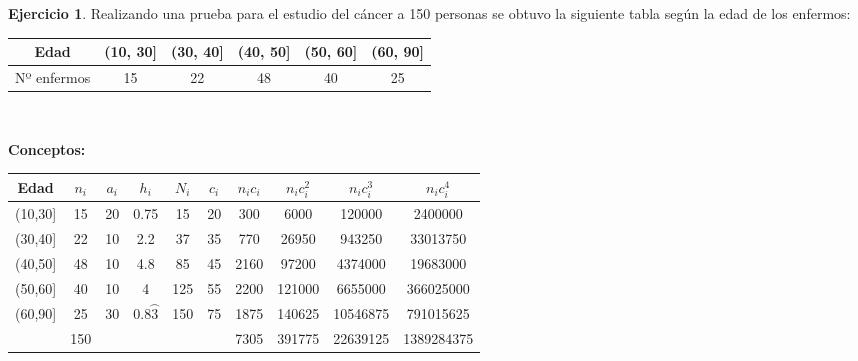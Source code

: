 \documentclass[a4paper, 12pt]{article}
\theoremstyle{definition}
\newtheorem{ej}{Ejercicio}
\begin{document}
\begin{ej}
Realizando una prueba para el estudio del cáncer a 150 personas se obtuvo la siguiente tabla según la edad de los enfermos:

\begin{center}
    \begin{tabular}{|c|c|c|c|c|c|}
    \hline
         Edad & (10, 30] & (30, 40] & (40, 50] & (50, 60] & (60, 90]  \\
         \hline
         Nº enfermos & 15 & 22 & 48 & 40 & 25 \\ 
         \hline
    \end{tabular} \\
    \end{center}
    
    \bigskip
    
\textbf{Conceptos:}
\begin{center}
\bigskip

    \begin{tabular}{|c|c|c|c|c|c|c|c|c|c|} 
    \hline
         Edad & $n_{i}$ & $a_{i}$ & $h_{i}$ & $N_{i}$ & $c_{i}$ & $n_{i}c_{i}$ & $n_{i}c_{i}^2$ & $n_{i}c_{i}^3$ & $n_{i}c_{i}^4$ \\
         \hline
         (10,30] & 15 & 20 & 0.75 & 15 & 20 & 300 & 6000 & 120000 & 2400000\\ 
         \hline
         (30,40] & 22 & 10 & 2.2 & 37 & 35 & 770 & 26950 & 943250 & 33013750\\ 
         \hline
         (40,50] & 48 & 10 & 4.8 & 85 & 45 & 2160 & 97200 & 4374000 & 19683000\\ 
         \hline
         (50,60] & 40 & 10 & 4 & 125 & 55 & 2200 & 121000 & 6655000 & 366025000\\ 
         \hline
         (60,90] & 25 & 30 & $0.8\wideparen{3}$ & 150 & 75 & 1875 & 140625 & 10546875 & 791015625\\ 
         \hline
         & 150 & & & & & 7305 & 391775 & 22639125 & 1389284375 \\ 
         \hline
    \end{tabular}
\end{center}


\end{ej}
\end{document}
